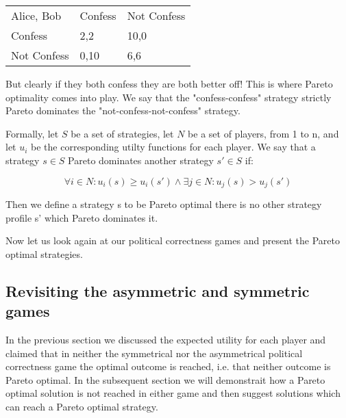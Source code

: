 \documentclass{article}
\begin{document}
\begin{table}[h]
\centering
\begin{tabular}{lll}
Alice, Bob   & Confess & Not Confess \\
Confess           & 2,2     & 10,0    \\
Not Confess        & 0,10    & 6,6
\end{tabular}
\end{table}

But clearly if they both confess they are both better off! This is where Pareto optimality comes into play. We say that the "confess-confess" strategy strictly Pareto dominates the "not-confess-not-confess" strategy.

Formally, let $S$ be a set of strategies, let $N$ be a set of players, from 1 to n, and let $u_i$ be the corresponding utilty functions for each player. We say that a strategy $s \in S$ Pareto dominates another strategy $s' \in S$ if:

\begin{equation*}
\forall i \in N: u_i(s) \geq u_i(s') \land \exists j \in N: u_j(s) > u_j(s')
\end{equation*}

Then we define a strategy s to be Pareto optimal there is no other strategy profile s' which Pareto dominates it. %


Now let us look again at our political correctness games and present the Pareto optimal strategies.

\subsection{Revisiting the asymmetric and symmetric games}
In the previous section we discussed the expected utility for each player and claimed that in neither the symmetrical nor the asymmetrical political correctness game the optimal outcome is reached, i.e. that neither outcome is Pareto optimal. In the subsequent section we will demonstrait how a Pareto optimal solution is not reached in either game and then suggest solutions which can reach a Pareto optimal strategy.
\end{document}
